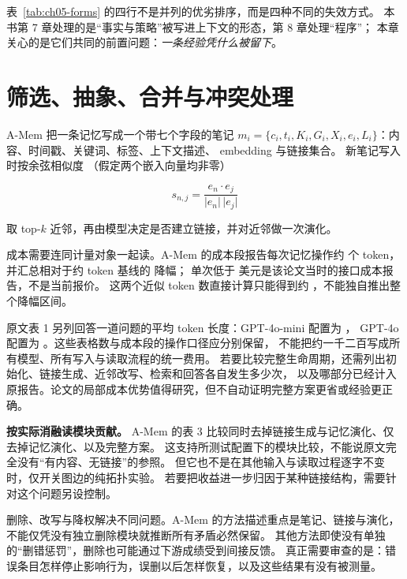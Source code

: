 表~\ref{tab:ch05-forms} 的四行不是并列的优劣排序，而是四种不同的失效方式。
本书第 7 章处理的是``事实与策略''被写进上下文的形态，第 8 章处理``程序''；
本章关心的是它们共同的前置问题：\emph{一条经验凭什么被留下}。

\section{筛选、抽象、合并与冲突处理}
\label{sec:ch05-curate}

A-Mem 把一条记忆写成一个带七个字段的笔记
$m_i=\{c_i,t_i,K_i,G_i,X_i,e_i,L_i\}$：内容、时间戳、关键词、标签、上下文描述、
embedding 与链接集合\cite{amem-2502}。
新笔记写入时按余弦相似度
（假定两个嵌入向量均非零）

\begin{equation}
s_{n,j}=\frac{e_n\cdot e_j}{\lvert e_n\rvert\,\lvert e_j\rvert}
\label{eq:ch05-link}
\end{equation}

取 top-$k$ 近邻，再由模型决定是否建立链接，并对近邻做一次演化\cite{amem-2502}。

\begin{sloppypar}
成本需要连同计量对象一起读。A-Mem 的成本段报告每次记忆操作约  个 token，
并汇总相对于约  token 基线的  降幅；
单次低于  美元是该论文当时的接口成本报告，不是当前报价\cite{amem-2502}。
这两个近似 token 数直接计算只能得到约 ，不能独自推出整个降幅区间。

原文表 1 另列回答一道问题的平均 token 长度：GPT-4o-mini 配置为 ，
GPT-4o 配置为 。这些表格数与成本段的操作口径应分别保留，
不能把约一千二百写成所有模型、所有写入与读取流程的统一费用。
若要比较完整生命周期，还需列出初始化、链接生成、近邻改写、检索和回答各自发生多少次，
以及哪部分已经计入原报告。论文的局部成本优势值得研究，但不自动证明完整方案更省或经验更正确。
\end{sloppypar}

\begin{principlebox}
\textbf{按实际消融读模块贡献。}
A-Mem 的表 3 比较同时去掉链接生成与记忆演化、仅去掉记忆演化、以及完整方案\cite{amem-2502}。
这支持所测试配置下的模块比较，不能说原文完全没有“有内容、无链接”的参照。
但它也不是在其他输入与读取过程逐字不变时，仅开关图边的纯拓扑实验。
若要把收益进一步归因于某种链接结构，需要针对这个问题另设控制。
\end{principlebox}

删除、改写与降权解决不同问题。A-Mem 的方法描述重点是笔记、链接与演化，
不能仅凭没有独立删除模块就推断所有矛盾必然保留。
其他方法即使没有单独的“删错惩罚”，删除也可能通过下游成绩受到间接反馈。
真正需要审查的是：错误条目怎样停止影响行为，误删以后怎样恢复，以及这些结果有没有被测量。

